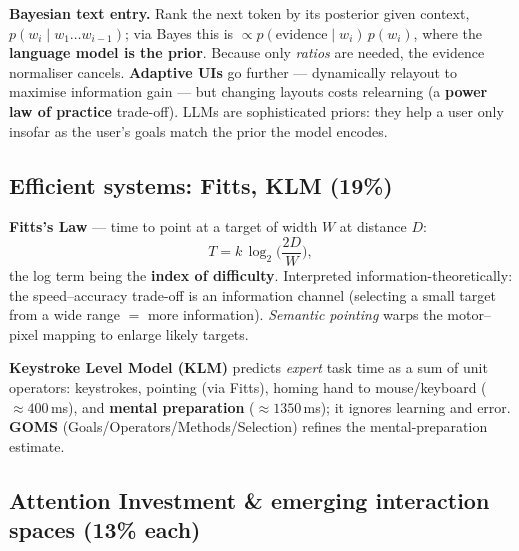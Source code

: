 \documentclass[11pt,a4paper]{article}
\begin{document}
\begin{useful}
\textbf{Bayesian text entry.} Rank the next token by its posterior given context, $p(w_i \mid w_1\dots w_{i-1})$; via Bayes this is $\propto p(\text{evidence}\mid w_i)\,p(w_i)$, where the \textbf{language model is the prior}. Because only \emph{ratios} are needed, the evidence normaliser cancels. \textbf{Adaptive UIs} go further --- dynamically relayout to maximise information gain --- but changing layouts costs relearning (a \textbf{power law of practice} trade-off). LLMs are sophisticated priors: they help a user only insofar as the user's goals match the prior the model encodes.
\end{useful}

\subsection{Efficient systems: Fitts, KLM (19\%)}

\begin{must}
\textbf{Fitts's Law} --- time to point at a target of width $W$ at distance $D$:
\[
  T = k\,\log_2\!\Big(\frac{2D}{W}\Big),
\]
the log term being the \textbf{index of difficulty}. Interpreted information-theoretically: the speed--accuracy trade-off is an information channel (selecting a small target from a wide range $=$ more information). \emph{Semantic pointing} warps the motor--pixel mapping to enlarge likely targets.
\end{must}

\textbf{Keystroke Level Model (KLM)} predicts \emph{expert} task time as a sum of unit operators: keystrokes, pointing (via Fitts), homing hand to mouse/keyboard ($\approx400$\,ms), and \textbf{mental preparation} ($\approx1350$\,ms); it ignores learning and error. \textbf{GOMS} (Goals/Operators/Methods/Selection) refines the mental-preparation estimate.

\subsection{Attention Investment \& emerging interaction spaces (13\% each)}
\end{document}

